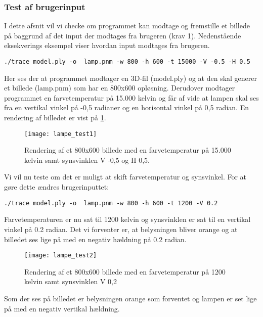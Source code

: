 \subsubsection{Test af brugerinput}

I dette afsnit vil vi checke om programmet kan modtage og fremstille et billede på baggrund af det input der modtages fra brugeren (krav 1). Nedenstående eksekverings eksempel viser hvordan input modtages fra brugeren.

\begin{lstlisting}
./trace model.ply -o  lamp.pnm -w 800 -h 600 -t 15000 -V -0.5 -H 0.5
\end{lstlisting}

Her ses der at programmet modtager en 3D-fil (model.ply) og at den skal generer et billede (lamp.pnm) som har en 800x600 opløsning. Derudover modtager programmet en farvetemperatur på 15.000 kelvin og får af vide at lampen skal ses fra en vertikal vinkel på -0,5 radianer og en horisontal vinkel på 0,5 radian. En rendering af billedet er vist på \ref{fig:lampe_test1}.

\begin{figure}[H]
  \centering
  \texttt{[image: lampe\_test1]}
  \caption{Rendering af et 800x600 billede med en farvetemperatur på 15.000 kelvin samt synsvinklen V -0,5 og H 0,5.}
    \label{fig:lampe_test1}
\end{figure}

Vi vil nu teste om det er muligt at skift farvetemperatur og synsvinkel. For at gøre dette ændres brugerinputtet:
\begin{lstlisting}
./trace model.ply -o  lamp.pnm -w 800 -h 600 -t 1200 -V 0.2
\end{lstlisting}

Farvetemperaturen er nu sat til 1200 kelvin og synsvinklen er sat til en vertikal vinkel på 0.2 radian. Det vi forventer er, at belysningen bliver orange og at billedet ses lige på med en negativ hældning på 0.2 radian.

\begin{figure}[H]
  \centering
  \texttt{[image: lampe\_test2]}
  \caption{Rendering af et 800x600 billede med en farvetemperatur på 1200 kelvin samt synsvinklen V 0,2}
    \label{fig:lampe_test2}
\end{figure}

Som der ses på billedet er belysningen orange som forventet og lampen er set lige på med en negativ vertikal hældning.


